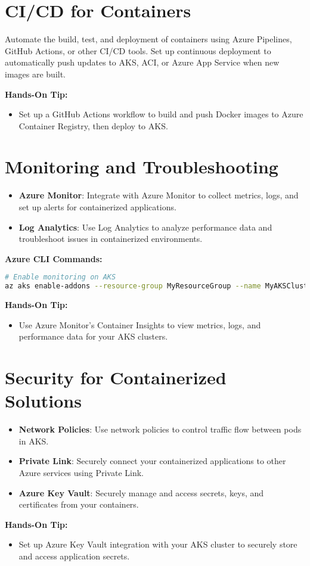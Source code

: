 \documentclass{article}
\begin{document}
\section{CI/CD for Containers}
Automate the build, test, and deployment of containers using Azure Pipelines, GitHub Actions, or other CI/CD tools. Set up continuous deployment to automatically push updates to AKS, ACI, or Azure App Service when new images are built.

\textbf{Hands-On Tip:}
\begin{itemize}
    \item Set up a GitHub Actions workflow to build and push Docker images to Azure Container Registry, then deploy to AKS.
\end{itemize}

\section{Monitoring and Troubleshooting}
\begin{itemize}
    \item \textbf{Azure Monitor}: Integrate with Azure Monitor to collect metrics, logs, and set up alerts for containerized applications.
    \item \textbf{Log Analytics}: Use Log Analytics to analyze performance data and troubleshoot issues in containerized environments.
\end{itemize}

\textbf{Azure CLI Commands:}
\begin{lstlisting}[language=bash]
# Enable monitoring on AKS
az aks enable-addons --resource-group MyResourceGroup --name MyAKSCluster --addons monitoring
\end{lstlisting}

\textbf{Hands-On Tip:}
\begin{itemize}
    \item Use Azure Monitor's Container Insights to view metrics, logs, and performance data for your AKS clusters.
\end{itemize}

\section{Security for Containerized Solutions}
\begin{itemize}
    \item \textbf{Network Policies}: Use network policies to control traffic flow between pods in AKS.
    \item \textbf{Private Link}: Securely connect your containerized applications to other Azure services using Private Link.
    \item \textbf{Azure Key Vault}: Securely manage and access secrets, keys, and certificates from your containers.
\end{itemize}

\textbf{Hands-On Tip:}
\begin{itemize}
    \item Set up Azure Key Vault integration with your AKS cluster to securely store and access application secrets.
\end{itemize}
\end{document}
